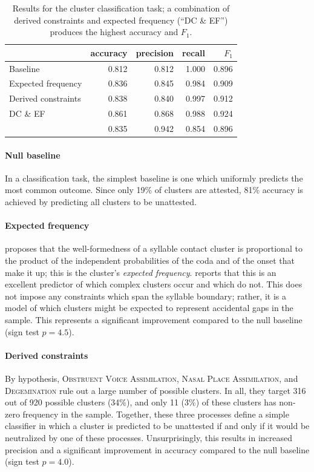 \begin{table}
\centering
\begin{tabular}{l | rrrr}
\toprule
                    & accuracy & precision & recall & $F_1$ \\
\midrule
Baseline            & 0.812    & 0.812     & 1.000  & 0.896 \\
Expected frequency  & 0.836    & 0.845     & 0.984  & 0.909 \\
Derived constraints & 0.838    & 0.840     & 0.997  & 0.912 \\
DC \& EF            & 0.861    & 0.868     & 0.988  & 0.924 \\
\citet{Hayes2008a}  & 0.835    & 0.942     & 0.854  & 0.896 \\
\bottomrule
\end{tabular}
\caption{Results for the cluster classification task; a combination of derived constraints and expected frequency (``DC \& EF'') produces the highest accuracy and $F_1$.}
\label{cmresults}
\end{table}

\paragraph{Null baseline} 
In a classification task, the simplest baseline is one which uniformly predicts the most common outcome. 
Since only 19\% of clusters are attested, 
81\% accuracy is achieved by predicting all clusters to be unattested.

\paragraph{Expected frequency} 
\citet{Pierrehumbert1994} proposes that the well-formedness of a syllable contact cluster is proportional to the product of the independent probabilities of the coda and of the onset that make it up; this is the cluster's \emph{expected frequency}. 
\citeauthor{Pierrehumbert1994} reports that this is an excellent predictor of which complex clusters occur and which do not. 
This does not impose any constraints which span the syllable boundary; rather, it is a model of which clusters might be expected to represent accidental gaps in the sample.
This represents a significant improvement compared to the null baseline (sign test $p = 4.5$).

\paragraph{Derived constraints} 
By hypothesis, \textsc{Obstruent Voice Assimilation}, \textsc{Nasal Place Assimilation}, and \textsc{Degemination} rule out a large number of possible clusters. 
In all, they target 316 out of 920 possible clusters (34\%), and only 11 (3\%) of these clusters has non-zero frequency in the sample.
Together, these three processes define a simple classifier in which a cluster is predicted to be unattested if and only if it would be neutralized by one of these processes. 
Unsurprisingly, this results in increased precision and a significant improvement in accuracy compared to the null baseline (sign test $p = 4.0$). 

